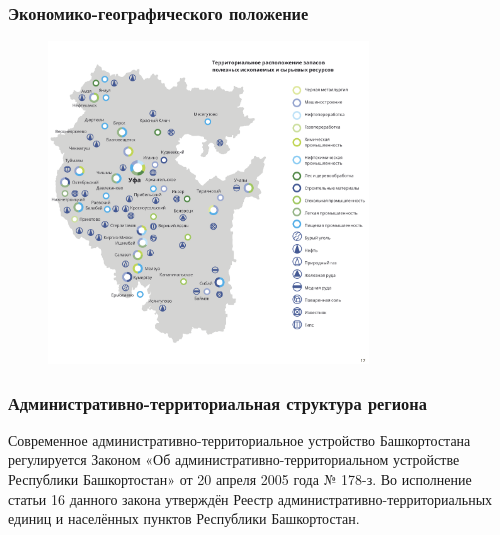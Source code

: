 \begin{frame}
\frametitle{Экономико-географического положение}

\begin{figure}[h!]
	\begin{center}
		{\includegraphics[width=85mm]{pics/alina/resource.png}}
	\end{center}
\end{figure}

\end{frame}

\begin{frame}
\frametitle{Административно-территориальная структура
	региона}

Современное административно-территориальное устройство Башкортостана регулируется Законом «Об административно-территориальном устройстве Республики Башкортостан» от 20 апреля 2005 года № 178-з. Во исполнение статьи 16 данного закона утверждён Реестр административно-территориальных единиц и населённых пунктов Республики Башкортостан.

\end{frame}

